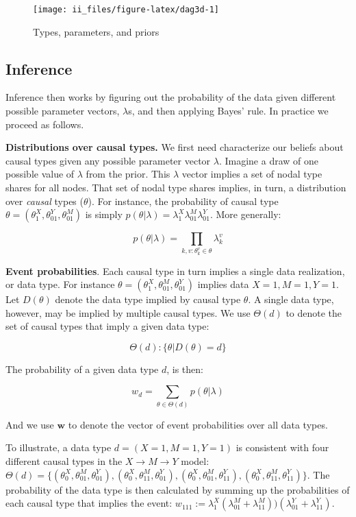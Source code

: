 \documentclass[
  12pt,
]{book}
\begin{document}
\begin{figure}
\texttt{[image: ii\_files/figure-latex/dag3d-1]} \caption{Types, parameters, and priors}\label{fig:dag3d}
\end{figure}

\hypertarget{inference}{%
\subsection{Inference}\label{inference}}

Inference then works by figuring out the probability of the data given different possible parameter vectors, \(\lambda\)s, and then applying Bayes' rule. In practice we proceed as follows.

\textbf{Distributions over causal types.} We first need characterize our beliefs about causal types given any possible parameter vector \(\lambda\). Imagine a draw of one possible value of \(\lambda\) from the prior. This \(\lambda\) vector implies a set of nodal type shares for all nodes. That set of nodal type shares implies, in turn, a distribution over \emph{causal} types (\(\theta\)). For instance, the probability of causal type \(\theta = (\theta^X_1, \theta^Y_{01}, \theta^M_{01})\) is simply \(p(\theta|\lambda)=\lambda^X_1\lambda^M_{01}\lambda^Y_{01}\). More generally:

\[p(\theta|\lambda) = \prod_{k,v:\theta^v_k\in\theta}\lambda^v_k\]

\textbf{Event probabilities}. Each causal type in turn implies a single data realization, or data type. For instance \(\theta = (\theta^X_1, \theta^M_{01}, \theta^Y_{01})\) implies data \(X=1, M=1, Y=1\). Let \(D(\theta)\) denote the data type implied by causal type \(\theta\). A single data type, however, may be implied by multiple causal types. We use \(\Theta(d)\) to denote the set of causal types that imply a given data type:

\[\Theta(d) : \{\theta| D(\theta) = d \}\]

The probability of a given data type \(d\), is then:

\[w_d = \sum_{\theta \in \Theta(d)}p(\theta|\lambda)\]

And we use \(\mathbf w\) to denote the vector of event probabilities over all data types.

To illustrate, a data type \(d = (X=1, M =1, Y=1)\) is consistent with four different causal types in the \(X\rightarrow M\rightarrow Y\) model: \(\Theta(d) = \{(\theta^X_0, \theta^M_{01}, \theta^Y_{01}), (\theta^X_0, \theta^M_{11}, \theta^Y_{01}), (\theta^X_0, \theta^M_{01}, \theta^Y_{11}), (\theta^X_0, \theta^M_{11}, \theta^Y_{11})\}\). The probability of the data type is then calculated by summing up the probabilities of each causal type that implies the event: \(w_{111}:=\lambda^X_1(\lambda^M_{01} + \lambda^M_{11}))(\lambda^Y_{01} + \lambda^Y_{11})\).
\end{document}
